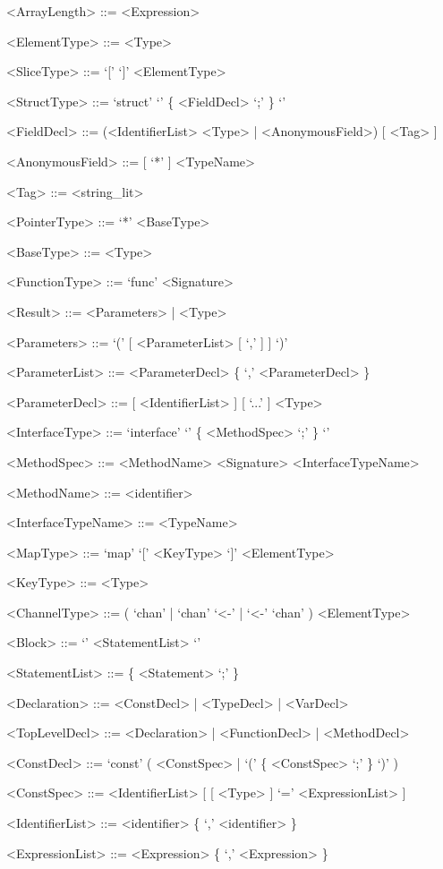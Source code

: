 \documentclass[letterpaper,11pt]{article}
\begin{document}
\begin{appendices}
\begin{grammar}
<ArrayLength> ::= <Expression>

<ElementType> ::= <Type>


<SliceType> ::= `[' `]' <ElementType>


<StructType>     ::= `struct' `{' \{ <FieldDecl> `;' \} `}'

<FieldDecl>      ::= (<IdentifierList> <Type> | <AnonymousField>) [ <Tag> ]

<AnonymousField> ::= [ `*' ] <TypeName>

<Tag>            ::= <string_lit>


<PointerType> ::= `*' <BaseType>

<BaseType>    ::= <Type>


<FunctionType>   ::= `func' <Signature>

<Result>         ::= <Parameters> | <Type>

<Parameters>     ::= `(' [ <ParameterList> [ `,' ] ] `)'

<ParameterList>  ::= <ParameterDecl> \{ `,' <ParameterDecl> \}

<ParameterDecl>  ::= [ <IdentifierList> ] [ `...' ] <Type>


<InterfaceType>      ::= `interface' `{' \{ <MethodSpec> `;' \} `}'

<MethodSpec>         ::= <MethodName> <Signature>
\alt <InterfaceTypeName>

<MethodName>         ::= <identifier>

<InterfaceTypeName>  ::= <TypeName>


<MapType>     ::= `map' `[' <KeyType> `]' <ElementType>

<KeyType>     ::= <Type>


<ChannelType> ::= ( `chan' | `chan' `<-' | `<-' `chan' ) <ElementType>


<Block> ::= `{' <StatementList> `}'

<StatementList> ::= \{ <Statement> `;' \}


<Declaration>   ::= <ConstDecl> | <TypeDecl> | <VarDecl>

<TopLevelDecl>  ::= <Declaration> | <FunctionDecl> | <MethodDecl>


<ConstDecl>      ::= `const' ( <ConstSpec> | `(' \{ <ConstSpec> `;' \} `)' )

<ConstSpec>      ::= <IdentifierList> [ [ <Type> ] `=' <ExpressionList> ]


<IdentifierList> ::= <identifier> \{ `,' <identifier> \}

<ExpressionList> ::= <Expression> \{ `,' <Expression> \}



\end{grammar}
\end{appendices}
\end{document}
